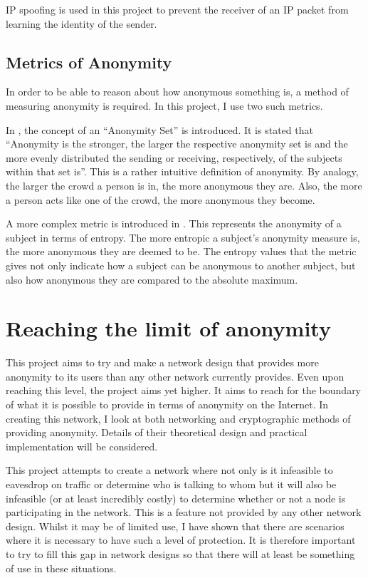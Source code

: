 \documentclass[ %
                    author={Luke Murray},
                supervisor={Dr. Simon Hollis},
                     title={Shadow Peer-to-Peer Networks},
                  subtitle={},
                    degree={MEng},
                      year={2013} ]{thesis}
\begin{document}
IP spoofing is used in this project to prevent the receiver of an IP packet from learning the identity of the sender.

\subsection{Metrics of Anonymity}

In order to be able to reason about how anonymous something is, a method of measuring anonymity is required. In this project, I use two such metrics.

In \cite{pfitzmann2001anonymity}, the concept of an ``Anonymity Set'' is introduced. It is stated that ``Anonymity is the stronger, the larger the respective anonymity set is and the more evenly
distributed the sending or receiving, respectively, of the subjects within that set is''. This is a rather intuitive definition of anonymity. By analogy, the larger the crowd a person is in, the more anonymous they are. Also, the more a person acts like one of the crowd, the more anonymous they become.

A more complex metric is introduced in \cite{serjantov2003towards}. This represents the anonymity of a subject in terms of entropy. The more entropic a subject's anonymity measure is, the more anonymous they are deemed to be. The entropy values that the metric gives not only indicate how a subject can be anonymous to another subject, but also how anonymous they are compared to the absolute maximum.


\section{Reaching the limit of anonymity}

This project aims to try and make a network design that provides more anonymity to its users than any other network currently provides. Even upon reaching this level, the project aims yet higher. It aims to reach for the boundary of what it is possible to provide in terms of anonymity on the Internet. In creating this network, I look at both networking and cryptographic methods of providing anonymity. Details of their theoretical design and practical implementation will be considered.

This project attempts to create a network where not only is it infeasible to eavesdrop on traffic or determine who is talking to whom but it will also be infeasible (or at least incredibly costly) to determine whether or not a node is participating in the network. This is a feature not provided by any other network design. Whilst it may be of limited use, I have shown that there are scenarios where it is necessary to have such a level of protection. It is therefore important to try to fill this gap in network designs so that there will at least be something of use in these situations.
\end{document}
